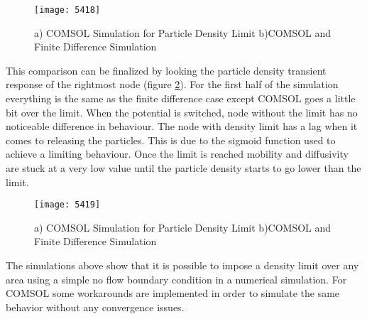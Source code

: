 \begin{doublespace}
\begin{figure}[!htp]
\centering
\texttt{[image: 5418]}
\caption{ a) COMSOL Simulation for Particle Density Limit b)COMSOL and Finite Difference Simulation} 
\label{5418}
\end{figure}

This comparison can be finalized by looking the particle density transient response of the rightmost node (figure \ref{5419}). For the first half of the simulation everything is the same as the finite difference case except COMSOL goes a little bit over the limit. When the potential is switched, node without the limit has no noticeable difference in behaviour. The node with density limit has a lag when it comes to releasing the particles. This is due to the sigmoid function used to achieve a limiting behaviour. Once the limit is reached mobility and diffusivity are stuck at a very low value until the particle density starts to go lower than the limit.

\begin{figure}[!htp]
\centering
\texttt{[image: 5419]}
\caption{ a) COMSOL Simulation for Particle Density Limit b)COMSOL and Finite Difference Simulation} 
\label{5419}
\end{figure}

The simulations above show that it is possible to impose a density limit over any area using a simple no flow boundary condition in a numerical simulation. For COMSOL some workarounds are implemented in order to simulate the same behavior without any convergence issues. 


\end{doublespace}